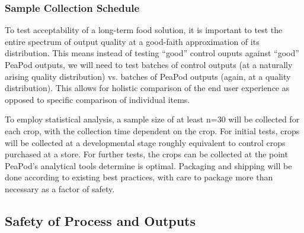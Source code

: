 
\subsubsection{Sample Collection Schedule}


To test acceptability of a long-term food solution, it is important to test the entire spectrum of output quality at a good-faith approximation of its distribution. This means instead of testing ``good'' control ouputs against ``good'' PeaPod outputs, we will need to test batches of control outputs (at a naturally arising quality distribution) vs. batches of PeaPod outputs (again, at a quality distribution). This allows for holistic comparison of the end user experience as opposed to specific comparison of individual items.

To employ statistical analysis, a sample size of at least n=30 will be collected for each crop, with the collection time dependent on the crop. For initial tests, crops will be collected at a developmental stage roughly equivalent to control crops purchased at a store. For further tests, the crops can be collected at the point PeaPod's analytical tools determine is optimal. Packaging and shipping will be done according to existing best practices, with care to package more than necessary as a factor of safety.



\clearpage

\subsection{Safety of Process and Outputs}


